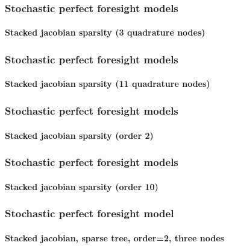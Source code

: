 \documentclass{beamer}
\begin{document}
\begin{frame}
    \frametitle{Stochastic perfect foresight models}
    \framesubtitle{Stacked jacobian sparsity (3 quadrature nodes)}
  \begin{center}
    \scalebox{.5}{
  }
  \end{center}

\end{frame}


\begin{frame}
    \frametitle{Stochastic perfect foresight models}
    \framesubtitle{Stacked jacobian sparsity (11 quadrature nodes)}
  \begin{center}
    \scalebox{.5}{
  }
  \end{center}

\end{frame}


\begin{frame}
    \frametitle{Stochastic perfect foresight models}
    \framesubtitle{Stacked jacobian sparsity (order 2)}
  \begin{center}
    \scalebox{.5}{
  }
  \end{center}

\end{frame}


\begin{frame}
    \frametitle{Stochastic perfect foresight models}
    \framesubtitle{Stacked jacobian sparsity (order 10)}
  \begin{center}
    \scalebox{.5}{
  }
  \end{center}

\end{frame}


\begin{frame}
    \frametitle{Stochastic perfect foresight model}
    \framesubtitle{Stacked jacobian, sparse tree, order=2, three nodes}
  \begin{center}
    \scalebox{.6}{
  }
  \end{center}

\end{frame}
\end{document}
